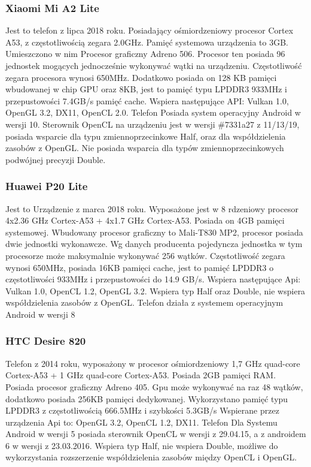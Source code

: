 \subsubsection[Xiaomi Mi A2 Lite]{Xiaomi Mi A2 Lite}
Jest to telefon z lipca 2018 roku. Posiadający ośmiordzeniowy procesor Cortex A53, z częstotliwością zegara 2.0GHz. Pamięć systemowa urządzenia to 3GB. Umieszczono w nim Procesor graficzny Adreno 506. Procesor ten posiada 96 jednostek mogących jednocześnie wykonywać wątki na urządzeniu. Częstotliwość zegara procesora wynosi 650MHz. Dodatkowo posiada on 128 KB pamięci wbudowanej w chip GPU oraz 8KB, jest to pamięć typu LPDDR3 933MHz i przepustowości 7.4GB/s pamięć cache. Wspiera następujące API: Vulkan 1.0, OpenGL 3.2, DX11, OpenCL 2.0. Telefon Posiada system operacyjny Android w wersji 10. Sterownik OpenCL na urządzeniu jest w wersji \#7331a27 z 11/13/19, posiada wsparcie dla typu zmiennoprzecinkowe Half, oraz dla współdzielenia zasobów z OpenGL. Nie posiada wsparcia dla typów zmiennoprzecinkowych podwójnej precyzji Double.
\subsubsection[Huawei P20 Lite]{Huawei P20 Lite}
Jest to Urządzenie z marca 2018 roku. Wyposażone jest w 8 rdzeniowy procesor 4x2.36 GHz Cortex-A53 + 4x1.7 GHz Cortex-A53. Posiada on 4GB pamięci systemowej. Wbudowany procesor graficzny to Mali-T830 MP2, procesor posiada dwie jednostki wykonawcze. Wg danych producenta pojedyncza jednostka w tym procesorze może maksymalnie wykonywać 256 wątków. Częstotliwość zegara wynosi 650MHz, posiada 16KB pamięci cache, jest to pamięć LPDDR3 o częstotliwości 933MHz i przepustowości do 14.9 GB/s. Wspiera następujące Api: Vulkan 1.0, OpenCL 1.2, OpenGL 3.2. Wspiera typ Half oraz Double, nie wspiera współdzielenia zasobów z OpenGL. Telefon działa z systemem operacyjnym Android w wersji 8
\subsubsection[HTC Desire 820]{HTC Desire 820}
Telefon z 2014 roku, wyposażony w procesor ośmiordzeniowy 1,7 GHz quad-core Cortex-A53 + 1 GHz quad-core Cortex-A53. Posiada 2GB pamięci RAM. Posiada procesor graficzny Adreno 405. Gpu może wykonywać na raz 48 wątków, dodatkowo posiada 256KB pamięci dedykowanej. Wykorzystano pamięć typu LPDDR3 z częstotliwością 666.5MHz i szybkości 5.3GB/s Wspierane przez urządzenia Api to: OpenGL 3.2, OpenCL 1.2, DX11. Telefon Dla Systemu Android w wersji 5 posiada sterownik OpenCL w wersji z 29.04.15, a z androidem 6 w wersji z 23.03.2016. Wspiera typ Half, nie wspiera Double, możliwe do wykorzystania rozszerzenie współdzielenia zasobów między OpenCL i OpenGL.
